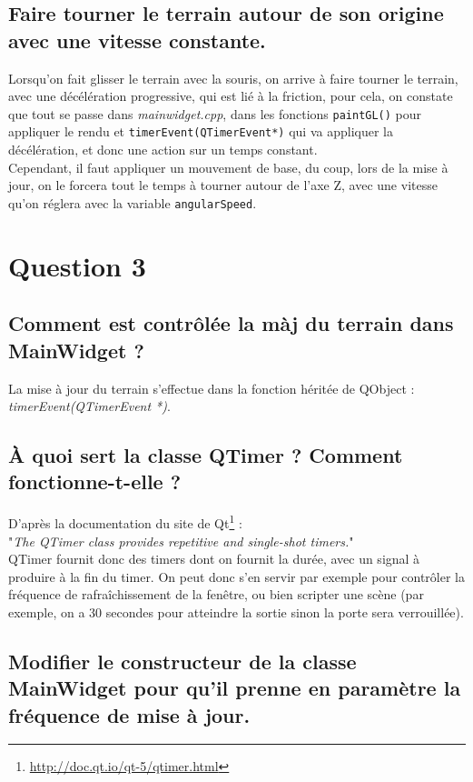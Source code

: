 \documentclass[a4paper,11pt]{report}
\begin{document}
	\subsection{Faire tourner le terrain autour de son origine avec une vitesse constante.}
		Lorsqu'on fait glisser le terrain avec la souris, on arrive à faire tourner le terrain, avec une décélération progressive, qui est lié à la friction, pour cela, on constate que tout se passe dans \textit{mainwidget.cpp}, dans les fonctions \texttt{paintGL()} pour appliquer le rendu et \texttt{timerEvent(QTimerEvent*)} qui va appliquer la décélération, et donc une action sur un temps constant.\\
		Cependant, il faut appliquer un mouvement de base, du coup, lors de la mise à jour, on le forcera tout le temps à tourner autour de l'axe Z, avec une vitesse qu'on réglera avec la variable \texttt{angularSpeed}.

	\pagebreak	
	\section{Question 3}
	\subsection{Comment est contrôlée la màj du terrain dans MainWidget ?}
	La mise à jour du terrain s'effectue dans la fonction héritée de QObject :  \textit{timerEvent(QTimerEvent *)}.
	
	\subsection{À quoi sert la classe QTimer ? Comment fonctionne-t-elle ?}
	D'après la documentation du site de Qt\footnote{\url{http://doc.qt.io/qt-5/qtimer.html}} :\\
	"\textit{The QTimer class provides repetitive and single-shot timers.}"\\
	QTimer fournit donc des timers dont on fournit la durée, avec un signal à produire à la fin du timer. On peut donc s'en servir par exemple pour contrôler la fréquence de rafraîchissement de la fenêtre, ou bien scripter une scène (par exemple, on a 30 secondes pour atteindre la sortie sinon la porte sera verrouillée).
	 
	
	\subsection{Modifier le constructeur de la classe MainWidget pour qu'il prenne en paramètre la fréquence de mise à jour.}
	
\end{document}
